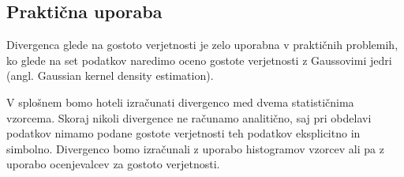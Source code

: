 \subsection{Praktična uporaba}

Divergenca glede na gostoto verjetnosti je zelo uporabna v praktičnih problemih, ko glede na set podatkov naredimo oceno gostote verjetnosti z Gaussovimi jedri (angl. Gaussian kernel density estimation).

V splošnem bomo hoteli izračunati divergenco med dvema statističnima vzorcema. Skoraj nikoli divergence ne računamo analitično, saj pri obdelavi podatkov nimamo podane gostote verjetnosti teh podatkov eksplicitno in simbolno. Divergenco bomo izračunali z uporabo histogramov vzorcev ali pa z uporabo ocenjevalcev za gostoto verjetnosti.
